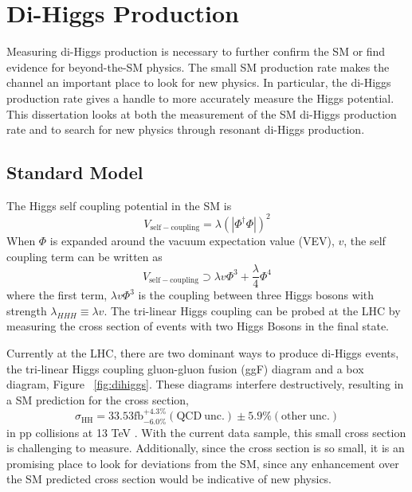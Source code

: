 \chapter{Di-Higgs Production}
\label{chap:dihiggs}
Measuring di-Higgs production is necessary to further confirm the SM or find evidence for beyond-the-SM physics. The small SM production rate makes the channel an important place to look for new physics.  In particular, the di-Higgs production rate gives a handle to more accurately measure the Higgs potential.  This dissertation looks at both the measurement of the SM di-Higgs production rate and to search for new physics through resonant di-Higgs production. 
\section{Standard Model}
The Higgs self coupling potential in the SM is
\begin{equation}
V_{\mathrm{self-coupling}} = \lambda(|\Phi^{\dagger}\Phi|)^{2}
\end{equation}
When ${\Phi}$ is expanded around the vacuum expectation value (VEV), $v$, the self coupling term can be written as
\begin{equation}
V_{\mathrm{self-coupling}} \supset \lambda v \Phi^{3} + \frac{\lambda}{4}\Phi^{4}
\end{equation}
where the first term, ${\lambda v \Phi^{3}}$ is the coupling between three Higgs bosons with strength ${\lambda_{HHH}\equiv \lambda v}$\cite{Belusevic:2004pz}. The tri-linear Higgs coupling can be probed at the LHC by measuring the cross section of events with two Higgs Bosons in the final state.\newline



\indent  Currently at the LHC, there are two dominant ways to produce di-Higgs events, the tri-linear Higgs coupling gluon-gluon fusion (ggF) diagram and a box diagram, Figure ~\ref{fig:dihiggs}. These diagrams interfere destructively, resulting in a SM prediction for the cross section, 
\begin{equation}
\sigma_{\mathrm{HH}} = 33.53\mathrm{fb}^{+4.3\%}_{-6.0\%}(\mathrm{QCD \ unc.})\pm{5.9\%} \mathrm{(other \ unc.)} 
\end{equation}
in pp collisions at 13 TeV \cite{Sirunyan:2018two}. With the current data sample, this small cross section is challenging to measure. Additionally, since the cross section is so small, it is an promising place to look for deviations from the SM, since any enhancement over the SM predicted cross section would be indicative of new physics.

